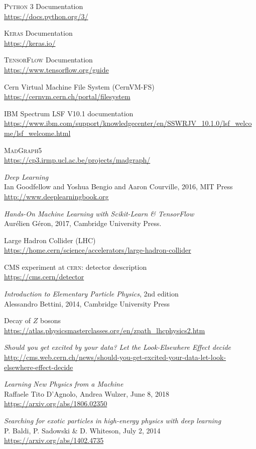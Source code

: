 \begin{thebibliography}{99}
\textsc{Python 3} Documentation
\\\url{https://docs.python.org/3/}

\textsc{Keras} Documentation 
\\\url{https://keras.io/}
 
\textsc{TensorFlow} Documentation 
\\\url{https://www.tensorflow.org/guide}

Cern Virtual Machine File System (CernVM-FS)
\\\url{https://cernvm.cern.ch/portal/filesystem}

IBM Spectrum LSF V10.1 documentation
\\\url{https://www.ibm.com/support/knowledgecenter/en/SSWRJV_10.1.0/lsf_welcome/lsf_welcome.html}

\textsc{MadGraph5}
\\\url{https://cp3.irmp.ucl.ac.be/projects/madgraph/}
 
\textit{Deep Learning}
\\Ian Goodfellow and Yoshua Bengio and Aaron Courville, 2016, MIT Press
\\\url{http://www.deeplearningbook.org}

\textit{Hands-On Machine Learning with Scikit-Learn \& TensorFlow}
\\Aurélien Géron, 2017, Cambridge University Press.

Large Hadron Collider (LHC)
\\\url{https://home.cern/science/accelerators/large-hadron-collider}

CMS experiment at \textsc{cern}: detector description
\\\url{https://cms.cern/detector}

\textit{Introduction to Elementary Particle Physics}, 2nd edition
\\Alessandro Bettini, 2014, Cambridge University Press

Decay of $Z$ bosons
\\\url{https://atlas.physicsmasterclasses.org/en/zpath_lhcphysics2.htm}

\textit{Should you get excited by your data? Let the Look-Elsewhere Effect decide}
\\\url{http://cms.web.cern.ch/news/should-you-get-excited-your-data-let-look-elsewhere-effect-decide}

\textit{Learning New Physics from a Machine}
\\Raffaele Tito D'Agnolo, Andrea Wulzer, June 8, 2018
\\\url{https://arxiv.org/abs/1806.02350}

\textit{Searching for exotic particles in high-energy physics with deep learning}
\\P. Baldi, P. Sadowski \& D. Whiteson, July 2, 2014
\\\url{https://arxiv.org/abs/1402.4735}
\end{thebibliography}